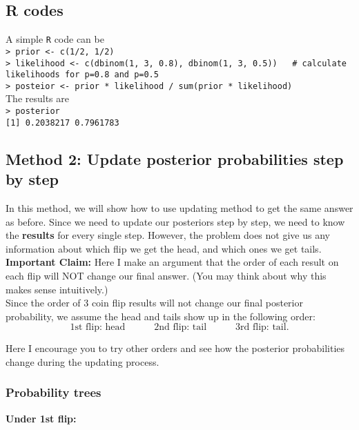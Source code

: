 \documentclass{article}
\begin{document}
\subsection*{R codes}

A simple \verb|R| code can be\\

\noindent \verb|> prior <- c(1/2, 1/2)| \\
\verb|> likelihood <- c(dbinom(1, 3, 0.8), dbinom(1, 3, 0.5))   # calculate likelihoods for p=0.8 and p=0.5|\\
\verb|> posteior <- prior * likelihood / sum(prior * likelihood)|\\

The results are\\

\noindent \verb|> posterior|\\
\verb|[1] 0.2038217 0.7961783|

\subsection*{Method 2: Update posterior probabilities step by step}

In this method, we will show how to use updating method to get the same answer as before. Since we need to update our posteriors step by step, we need to know the \textbf{results} for every single step. However, the problem does not give us any information about which flip we get the head, and which ones we get tails.\\

\textbf{Important Claim:} Here I make an argument that the order of each result on each flip will NOT change our final answer. (You may think about why this makes sense intuitively.)\\

Since the order of 3 coin flip results will not change our final posterior probability, we assume the head and tails show up in the following order:
$$ \text{1st flip: head} \qquad\quad \text{2nd flip: tail} \qquad\quad \text{3rd flip: tail}. $$

Here I encourage you to try other orders and see how the posterior probabilities change during the updating process.

\subsubsection*{Probability trees}

\textbf{Under 1st flip:}
\end{document}
